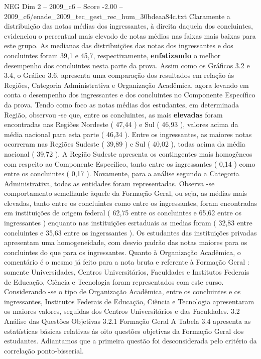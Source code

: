 \begin{textsample}{NEG Dim 2 – 2009\_c6 – Score -2.00 – 2009\_c6/enade\_2009\_tec\_gest\_rec\_hum\_30bdeaa84c.txt}
Claramente a distribuição das notas médias dos ingressantes, à direita daquela dos concluintes, evidenciou o percentual mais elevado de notas médias nas faixas mais baixas para este grupo.
As medianas das distribuições das notas dos ingressantes e dos concluintes foram 39,1 e 45,7, respectivamente, \textbf{enfatizando} o melhor desempenho dos concluintes nesta parte da prova.
Assim como os Gráficos 3.2 e 3.4, o Gráfico 3.6, apresenta uma comparação dos resultados em relação às Regiões, Categoria Administrativa e Organização Acadêmica, agora levando em conta o desempenho dos ingressantes e dos concluintes no Componente Específico da prova.
Tendo como foco as notas médias dos estudantes, em determinada Região, observou -se que, entre os concluintes, as mais \textbf{elevadas} foram encontradas nas Regiões Nordeste ( 47,44 ) e Sul ( 46,93 ), valores acima da média nacional para esta parte ( 46,34 ).
Entre os ingressantes, as maiores notas ocorreram nas Regiões Sudeste ( 39,89 ) e Sul ( 40,02 ), todas acima da média nacional ( 39,72 ).
A Região Sudeste apresenta os contingentes mais homogêneos com respeito ao Componente Específico, tanto entre os ingressantes ( 0,14 ) como entre os concluintes ( 0,17 ).
Novamente, para a análise segundo a Categoria Administrativa, todas as entidades foram representadas.
Observa -se comportamento semelhante àquele da Formação Geral, ou seja, as médias mais elevadas, tanto entre os concluintes como entre os ingressantes, foram encontradas em instituições de origem federal ( 62,75 entre os concluintes e 65,62 entre os ingressantes ) enquanto nas instituições esrtaduais as medias foram ( 32,83 entre concluintes e 35,63 entre os ingerssantes ).
Os estudantes das instituições privadas apresentam uma homogeneidade, com desvio padrão das notas maiores para os concluintes do que para os ingressantes.
Quanto à Organização Acadêmica, o comentário é o mesmo já feito para a nota bruta e referente à Formação Geral : somente Universidades, Centros Universitários, Faculdades e Institutos Federais de Educação, Ciência e Tecnologia foram representados com este curso.
Considerando -se o tipo de Organização Acadêmica, entre os concluintes e os ingressantes, Institutos Federais de Educação, Ciência e Tecnologia apresentaram os maiores valores, seguidas dos Centros Universitários e das Faculdades. 3.2 Análise das Questões Objetivas 3.2.1 Formação Geral A Tabela 3.4 apresenta as estatísticas básicas relativas às oito questões objetivas da Formação Geral dos estudantes.
Adiantamos que a primeira questão foi desconsiderada pelo critério da correlação ponto-bisserial.

\end{textsample}
